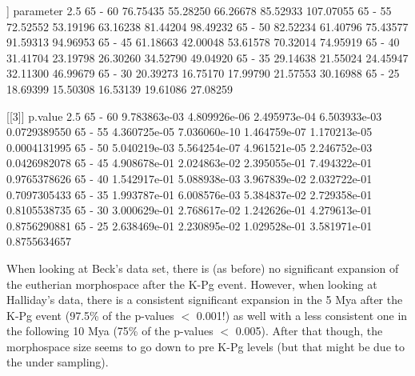 \documentclass{article}
\begin{document}
\begin{Schunk}
\begin{Soutput}
[[2]]
        parameter     2.5%      25%      75%     97.5%
65 - 60  76.75435 55.28250 66.26678 85.52933 107.07055
65 - 55  72.52552 53.19196 63.16238 81.44204  98.49232
65 - 50  82.52234 61.40796 75.43577 91.59313  94.96953
65 - 45  61.18663 42.00048 53.61578 70.32014  74.95919
65 - 40  31.41704 23.19798 26.30260 34.52790  49.04920
65 - 35  29.14638 21.55024 24.45947 32.11300  46.99679
65 - 30  20.39273 16.75170 17.99790 21.57553  30.16988
65 - 25  18.69399 15.50308 16.53139 19.61086  27.08259

[[3]]
             p.value         2.5%          25%          75%        97.5%
65 - 60 9.783863e-03 4.809926e-06 2.495973e-04 6.503933e-03 0.0729389550
65 - 55 4.360725e-05 7.036060e-10 1.464759e-07 1.170213e-05 0.0004131995
65 - 50 5.040219e-03 5.564254e-07 4.961521e-05 2.246752e-03 0.0426982078
65 - 45 4.908678e-01 2.024863e-02 2.395055e-01 7.494322e-01 0.9765378626
65 - 40 1.542917e-01 5.088938e-03 3.967839e-02 2.032722e-01 0.7097305433
65 - 35 1.993787e-01 6.008576e-03 5.384837e-02 2.729358e-01 0.8105538735
65 - 30 3.000629e-01 2.768617e-02 1.242626e-01 4.279613e-01 0.8756290881
65 - 25 2.638469e-01 2.230895e-02 1.029528e-01 3.581971e-01 0.8755634657
\end{Soutput}
\end{Schunk}

When looking at Beck's data set, there is (as before) no significant expansion of the eutherian morphospace after the K-Pg event.
However, when looking at Halliday's data, there is a consistent significant expansion in the 5 Mya after the K-Pg event (97.5\% of the p-values $<$ 0.001!) as well with a less consistent one in the following 10 Mya (75\% of the p-values $<$ 0.005).
After that though, the morphospace size seems to go down to pre K-Pg levels (but that might be due to the under sampling).
\end{document}
